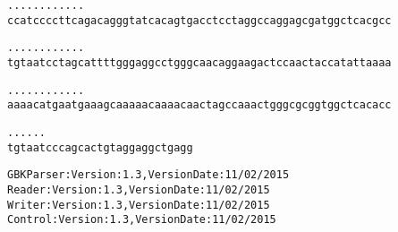 \documentclass{article}
\begin{document}
\newpage
\begin{alltt}
   .    .    .    .    .    .    .    .    .    .    .    . 
ccatccccttcagacagggtatcacagtgacctcctaggccaggagcgatggctcacgcc

   .    .    .    .    .    .    .    .    .    .    .    . 
tgtaatcctagcattttgggaggcctgggcaacaggaagactccaactaccatattaaaa

   .    .    .    .    .    .    .    .    .    .    .    . 
aaaacatgaatgaaagcaaaaacaaaacaactagccaaactgggcgcggtggctcacacc

   .    .    .    .    .    .
tgtaatcccagcactgtaggaggctgagg
\end{alltt}
\newpage
\begin{alltt}
GBK Parser: Version: 1.3, Version Date: 11/02/2015
Reader: Version: 1.3, Version Date: 11/02/2015
Writer: Version: 1.3, Version Date: 11/02/2015
Control: Version: 1.3, Version Date: 11/02/2015
\end{alltt}
\end{document}
